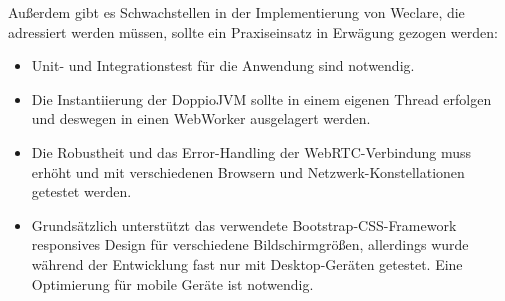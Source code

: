Außerdem gibt es Schwachstellen in der Implementierung von Weclare, die adressiert werden müssen, sollte ein Praxiseinsatz in Erwägung gezogen werden:
\begin{itemize}
    \item Unit- und Integrationstest für die Anwendung sind notwendig.
    \item Die Instantiierung der DoppioJVM sollte in einem eigenen Thread erfolgen und deswegen in einen WebWorker ausgelagert werden.
    \item Die Robustheit und das Error-Handling der WebRTC-Verbindung muss erhöht und mit verschiedenen Browsern und Netzwerk-Konstellationen getestet werden.
    \item Grundsätzlich unterstützt das verwendete Bootstrap-CSS-Framework responsives Design für verschiedene Bildschirmgrößen, allerdings wurde während der Entwicklung fast nur mit Desktop-Geräten getestet. Eine Optimierung für mobile Geräte ist notwendig.
\end{itemize}
